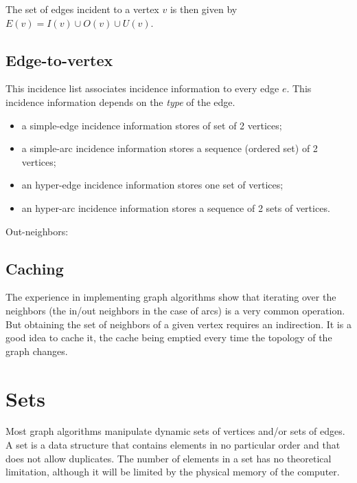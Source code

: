 \documentclass{article}
\begin{document}
The set of  edges incident to a vertex $v$ is then given by $E(v) = I(v) \cup O(v) \cup U(v)$.


\subsection{Edge-to-vertex}

This incidence list associates incidence information to every edge $e$.
This incidence information depends on the \textit{type} of the edge.
\begin{itemize}
\item a simple-edge incidence information stores of set of 2 vertices;
\item a simple-arc incidence information stores a sequence (ordered set) of 2 vertices;
\item an hyper-edge incidence information stores one set of vertices;
\item an hyper-arc incidence information stores a sequence of 2 sets of vertices.
\end{itemize}

Out-neighbors: $ $

\subsection{Caching}

The experience in implementing graph algorithms show that iterating over the neighbors (the in/out neighbors in the case of arcs) is a very common operation. But obtaining the set of neighbors of a given vertex requires an indirection. It is a good idea to cache it, the cache being emptied every time the topology of the graph changes.


\section{Sets}


Most graph algorithms
manipulate dynamic sets of vertices and/or sets of edges. A set is a data
structure that contains elements in no particular order and that does not allow duplicates. The number of elements in a set has no theoretical limitation,
although it will be limited by the physical memory of the computer.
\end{document}
